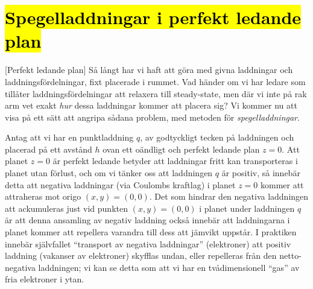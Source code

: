 {{\section{{\hl{Spegelladdningar i perfekt ledande plan}}}
[Perfekt ledande plan]
S{\aa} l{\aa}ngt har vi haft att g{\"o}ra med givna laddningar och
laddningsf{\"o}rdelningar, fixt placerade i rummet. Vad h{\"a}nder om
vi har ledare som till{\aa}ter laddningsf{\"o}rdelningar att relaxera till
steady-state, men d{\"a}r vi inte p{\aa} rak arm vet exakt {\it hur} dessa
laddningar kommer att placera sig? Vi kommer nu att visa p{\aa} ett s{\"a}tt
att angripa s{\aa}dana problem, med metoden f{\"o}r {\it spegelladdningar}.

Antag att vi har en punktladdning $q$, av godtyckligt tecken p{\aa} laddningen
och placerad p{\aa} ett avst{\aa}nd $h$ ovan ett o{\"a}ndligt och perfekt
ledande plan $z=0$.
\noindent
Att planet $z=0$ {\"a}r perfekt ledande betyder att laddningar fritt kan
transporteras i planet utan f{\"o}rlust, och om vi t{\"a}nker oss att laddningen
$q$ {\"a}r positiv, s{\aa} inneb{\"a}r detta att negativa laddningar (via
Coulombs kraftlag) i planet $z=0$ kommer att attraheras mot origo $(x,y)=(0,0)$.
Det som hindrar den negativa laddningen att ackumuleras just vid punkten
$(x,y)=(0,0)$ i planet under laddningen $q$ {\"a}r att denna ansamling av
negativ laddning ocks{\aa} inneb{\"a}r att laddningarna i planet kommer att
repellera varandra till dess att j{\"a}mvikt uppst{\aa}r.
I praktiken inneb{\"a}r sj{\"a}lvfallet ``transport av negativa laddningar''
(elektroner) att positiv laddning (vakanser av elektroner) skyfflas undan,
eller repelleras fr{\aa}n den netto-negativa laddningen; vi kan se detta som
att vi har en tv{\aa}dimensionell ``gas'' av fria elektroner i ytan.
\vfill\eject

}}
